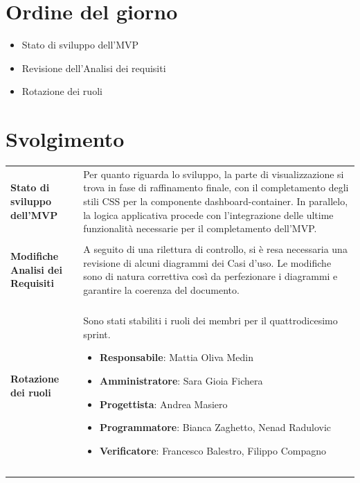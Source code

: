 \documentclass[a4paper,12pt]{article}
\begin{document}


\newpage
\tableofcontents
\newpage

\markright{}

\newpage
\section{Ordine del giorno}

\begin{itemize}
    \item Stato di sviluppo dell'MVP
    \item Revisione dell'Analisi dei requisiti
    \item Rotazione dei ruoli
\end{itemize}

\section{Svolgimento}
\begin{longtable}{P{4cm}|P{9cm}}
\textbf{Stato di sviluppo dell'MVP} & Per quanto riguarda lo sviluppo, la parte di visualizzazione si trova in fase di raffinamento finale, con il completamento degli stili CSS per la componente dashboard-container. In parallelo, la logica applicativa procede con l'integrazione delle ultime funzionalità necessarie per il completamento dell'MVP.\\
\\
\textbf{Modifiche Analisi dei Requisiti} & 
A seguito di una rilettura di controllo, si è resa necessaria una revisione di alcuni diagrammi dei Casi d'uso. Le modifiche sono di natura correttiva così da perfezionare i diagrammi e garantire la coerenza del documento. \\
\\
\textbf{Rotazione dei ruoli} & Sono stati stabiliti i ruoli dei membri per il quattrodicesimo sprint.
            \begin{itemize}
                \item \textbf{Responsabile}: Mattia Oliva Medin
                \item \textbf{Amministratore}: Sara Gioia Fichera 
                \item \textbf{Progettista}: Andrea Masiero
                \item \textbf{Programmatore}: Bianca Zaghetto, Nenad Radulovic 
                \item \textbf{Verificatore}: Francesco Balestro, Filippo Compagno
            \end{itemize}\\\\
\\
\end{longtable}
\end{document}
